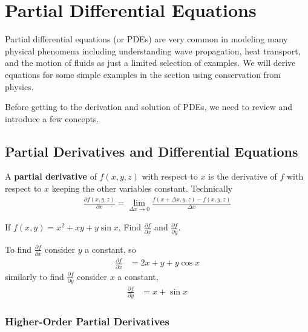 

\chapter{Partial Differential Equations}

Partial differential equations (or PDEs) are very common in modeling many physical phenomena including understanding wave propagation, heat transport, and the motion of fluids as just a limited selection of examples.   We will derive equations for some simple examples in the section using conservation from physics.  

Before getting to the derivation and solution of PDEs, we need to review and introduce a few concepts.

\section{Partial Derivatives and Differential Equations}   \label{sect:part:deriv:diff:eqns}


\begin{definition}
A \textbf{partial derivative} of $f(x,y,z)$ with respect to $x$ is the derivative of $f$ with respect to $x$ keeping the other variables constant.  Technically 
%
\begin{align*}
\frac{\partial f(x,y,z)}{\partial x} = \lim_{\Delta x \rightarrow 0} \frac{f(x+\Delta x,y,z)-f(x,y,z)}{\Delta x} 
\end{align*}
\end{definition}

\begin{example}
If $f(x,y) = x^2 + xy + y \sin x$, Find $\displaystyle \frac{\partial f}{\partial x}$ and $\displaystyle \frac{\partial f}{\partial y}$.  

\solution

To find $\frac{\partial f}{\partial x}$ consider $y$ a constant, so
%
\begin{align*}
\frac{\partial f}{\partial x} & = 2x + y + y \cos x
\end{align*}
similarly to find $\frac{\partial f}{\partial y}$ consider $x$ a constant,
%
\begin{align*}
\frac{\partial f}{\partial y} & = x + \sin x
\end{align*}
\end{example}

\subsection{Higher-Order Partial Derivatives}

